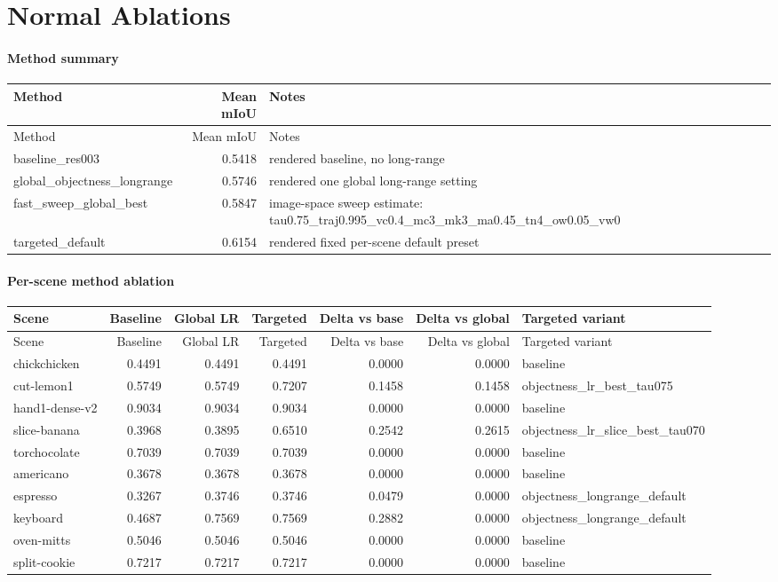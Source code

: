 \documentclass[10pt]{article}
\begin{document}
\section{Normal Ablations}
\paragraph{Method summary}
\small
\begin{longtable}{lrp{9cm}}
\toprule
Method & Mean mIoU & Notes \\
\midrule
\endfirsthead
\toprule
Method & Mean mIoU & Notes \\
\midrule
\endhead
baseline\_res003 & 0.5418 & rendered baseline, no long-range \\
global\_objectness\_longrange & 0.5746 & rendered one global long-range setting \\
fast\_sweep\_global\_best & 0.5847 & image-space sweep estimate: tau0.75\_traj0.995\_vc0.4\_mc3\_mk3\_ma0.45\_tn4\_ow0.05\_vw0 \\
targeted\_default & 0.6154 & rendered fixed per-scene default preset \\
\bottomrule
\end{longtable}
\normalsize

\paragraph{Per-scene method ablation}
\small
\begin{longtable}{lrrrrrl}
\toprule
Scene & Baseline & Global LR & Targeted & Delta vs base & Delta vs global & Targeted variant \\
\midrule
\endfirsthead
\toprule
Scene & Baseline & Global LR & Targeted & Delta vs base & Delta vs global & Targeted variant \\
\midrule
\endhead
chickchicken & 0.4491 & 0.4491 & 0.4491 & 0.0000 & 0.0000 & baseline \\
cut-lemon1 & 0.5749 & 0.5749 & 0.7207 & 0.1458 & 0.1458 & objectness\_lr\_best\_tau075 \\
hand1-dense-v2 & 0.9034 & 0.9034 & 0.9034 & 0.0000 & 0.0000 & baseline \\
slice-banana & 0.3968 & 0.3895 & 0.6510 & 0.2542 & 0.2615 & objectness\_lr\_slice\_best\_tau070 \\
torchocolate & 0.7039 & 0.7039 & 0.7039 & 0.0000 & 0.0000 & baseline \\
americano & 0.3678 & 0.3678 & 0.3678 & 0.0000 & 0.0000 & baseline \\
espresso & 0.3267 & 0.3746 & 0.3746 & 0.0479 & 0.0000 & objectness\_longrange\_default \\
keyboard & 0.4687 & 0.7569 & 0.7569 & 0.2882 & 0.0000 & objectness\_longrange\_default \\
oven-mitts & 0.5046 & 0.5046 & 0.5046 & 0.0000 & 0.0000 & baseline \\
split-cookie & 0.7217 & 0.7217 & 0.7217 & 0.0000 & 0.0000 & baseline \\
\bottomrule
\end{longtable}
\normalsize
\end{document}
